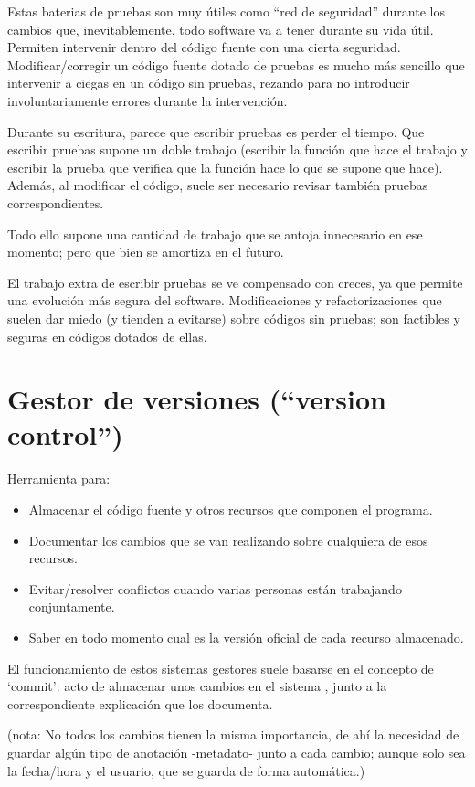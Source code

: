 \documentclass[spanish,12pt,a4paper,final,oneside]{book}
\begin{document}
Estas baterias de pruebas son muy útiles como ``red de seguridad'' durante los cambios que, inevitablemente, todo software va a tener durante su vida útil. Permiten intervenir dentro del código fuente con una cierta seguridad. Modificar/corregir un código fuente dotado de pruebas es mucho más sencillo que intervenir a ciegas en un código sin pruebas, rezando para no introducir involuntariamente errores durante la intervención.

Durante su escritura, parece que escribir pruebas es perder el tiempo. Que escribir pruebas supone un doble trabajo (escribir la función que hace el trabajo y escribir la prueba que verifica que la función hace lo que se supone que hace). Además, al modificar el código, suele ser necesario revisar también pruebas correspondientes. 

Todo ello supone una cantidad de trabajo que se antoja innecesario en ese momento; pero que bien se amortiza en el futuro.

El trabajo extra de escribir pruebas se ve compensado con creces, ya que permite una evolución más segura del software. Modificaciones y refactorizaciones que suelen dar miedo (y tienden a evitarse) sobre códigos sin pruebas; son factibles y seguras en códigos dotados de ellas.

\newpage
\section{Gestor de versiones (``version control'')}
Herramienta para:
\begin{itemize}
\item Almacenar el código fuente y otros recursos que componen el programa.
\item Documentar los cambios que se van realizando sobre cualquiera de esos recursos.
\item Evitar/resolver conflictos cuando varias personas están trabajando conjuntamente.
\item Saber en todo momento cual es la versión oficial de cada recurso almacenado.
\end{itemize}

El funcionamiento de estos sistemas gestores suele basarse en el concepto de ‘commit’: acto de almacenar unos cambios en el sistema , junto a la correspondiente explicación que los documenta. 

(nota: No todos los cambios tienen la misma importancia, de ahí la necesidad de guardar algún tipo de anotación -metadato- junto a cada cambio; aunque solo sea la fecha/hora y el usuario, que se guarda de forma automática.)
\end{document}
